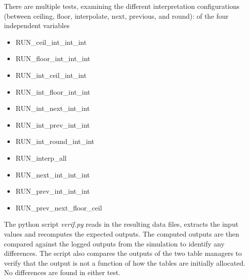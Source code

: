 \documentclass[11pt,fleqn]{report}
\begin{document}
There are multiple tests, examining the different interpretation configurations
(between ceiling, floor, interpolate, next, previous, and round):
of the four independent variables
\begin{itemize}
  \item RUN\_ceil\_int\_int\_int
  \item RUN\_floor\_int\_int\_int
  \item RUN\_int\_ceil\_int\_int
  \item RUN\_int\_floor\_int\_int
  \item RUN\_int\_next\_int\_int
  \item RUN\_int\_prev\_int\_int
  \item RUN\_int\_round\_int\_int
  \item RUN\_interp\_all
  \item RUN\_next\_int\_int\_int
  \item RUN\_prev\_int\_int\_int
  \item RUN\_prev\_next\_floor\_ceil
\end{itemize}

The python script \textit{verif.py} reads in the resulting data files,
extracts the input values and recomputes the expected outputs.  The computed
outputs are then compared against the logged outputs from the simulation to
identify any differences. The script also compares the outputs of the two
table managers to verify that the output is not a function of how the tables
are initially allocated. No differences are found in either test.
\end{document}
